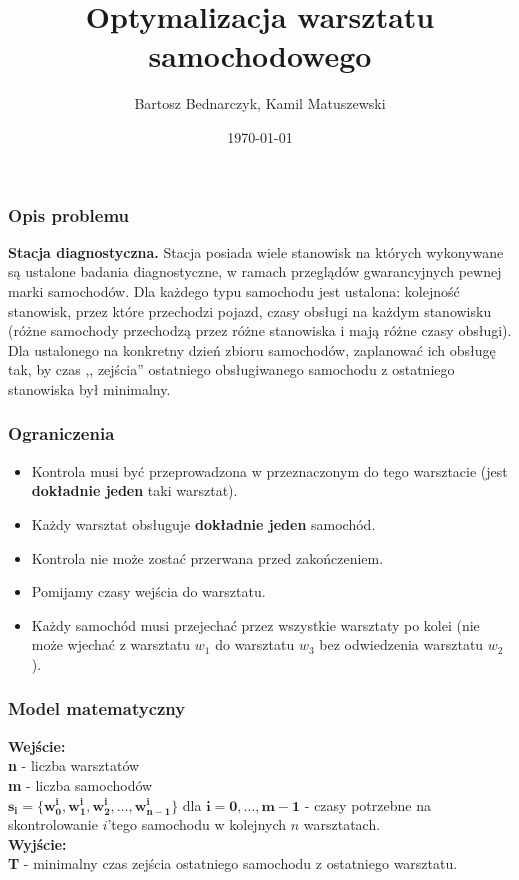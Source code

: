 \documentclass{beamer}
\title[Optymalizacja warsztatu samochodowego]{Optymalizacja warsztatu samochodowego}
\author{Bartosz Bednarczyk, Kamil Matuszewski}
\institute[UWr]
{
Uniwersytet Wrocławski \\
\medskip
\textit{bbednarczyk@stud.cs.uni.wroc.pl}\\
\medskip
\textit{kamil.k.mat@gmail.com}
}
\date{\today}
\theoremstyle{example}
\theoremstyle{example}
\theoremstyle{example}
\begin{document}
\begin{frame}
\titlepage 
\end{frame}


\begin{frame}
\frametitle{Opis problemu}
\textbf{Stacja diagnostyczna.} Stacja posiada wiele stanowisk na których wykonywane są ustalone badania diagnostyczne, w ramach przeglądów gwarancyjnych pewnej marki samochodów. Dla każdego typu samochodu jest ustalona: kolejność stanowisk, przez które przechodzi pojazd, czasy obsługi na każdym stanowisku (różne samochody przechodzą przez różne stanowiska i mają różne czasy obsługi). Dla ustalonego na konkretny dzień zbioru samochodów, zaplanować ich obsługę tak, by czas ,, zejścia'' ostatniego obsługiwanego samochodu z ostatniego stanowiska był minimalny.

\end{frame}

\begin{frame}
\frametitle{Ograniczenia}
\begin{itemize}
\item Kontrola musi być przeprowadzona w przeznaczonym do tego warsztacie (jest \textbf{dokładnie jeden} taki warsztat).
\item Każdy warsztat obsługuje \textbf{dokładnie jeden} samochód.
\item Kontrola nie może zostać przerwana przed zakończeniem.
\item Pomijamy czasy wejścia do warsztatu.
\item Każdy samochód musi przejechać przez wszystkie warsztaty po kolei (nie może wjechać z warsztatu \textit{$w_1$} do warsztatu \textit{$w_3$} bez odwiedzenia warsztatu \textit{$w_2$}).
\end{itemize}
\end{frame}


\begin{frame}
\frametitle{Model matematyczny}	

{\large\textbf{Wejście:}}\\
\textbf{n} - liczba warsztatów\\
\textbf{m} - liczba samochodów\\
$\mathbf{s_i = \{ w_0^i, w_1^i, w_2^i, \dots , w_{n-1}^i \}} $ dla $\mathbf{i=0,\dots , m-1}$  - czasy potrzebne na skontrolowanie $i$'tego samochodu w kolejnych $n$ warsztatach.\\ 
{\large\textbf{Wyjście:}}\\
\textbf{T} - minimalny czas zejścia ostatniego samochodu z ostatniego warsztatu.

\end{frame}
\end{document}
